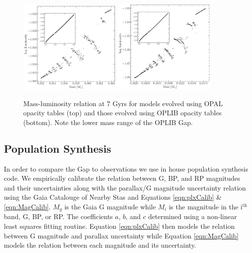 \begin{figure}
	\centering
	\includegraphics[width=0.45\textwidth]{OPALPunchIn.pdf}
	\includegraphics[width=0.45\textwidth]{OPLIBPunchIn.pdf}
	\caption{Mass-luminosity relation at 7 Gyrs for models evolved using OPAL opacity
	tables (top) and those evolved using OPLIB opacity tables (bottom). Note
	the lower mass range of the OPLIB Gap.}
	\label{fig:PunchIn}
		
\end{figure}

\subsection{Population Synthesis}
In order to compare the Gap to observations we use in house population
synthesis code. We empirically calibrate the relation between G, BP, and RP
magnitudes and their uncertainties along with the parallax/G magnitude
uncertainty relation using the Gaia Catalouge of Nearby Stas
\citep[GCNS,][]{GaiaCollaboration2021} and Equations \ref{eqn:plxCalib} \&
\ref{eqn:MagCalib}. $M_{g}$ is the Gaia G magnitude while $M_{i}$ is the
magnitude in the i$^\text{th}$ band, G, BP, or RP. The coefficients $a$, $b$,
and $c$ determined using a non-linear least squares fitting routine. Equation
\ref{eqn:plxCalib} then models the relation between G magnitude and parallax
uncertainty while Equation \ref{eqn:MagCalib} models the relation between each
magnitude and its uncertainty.

